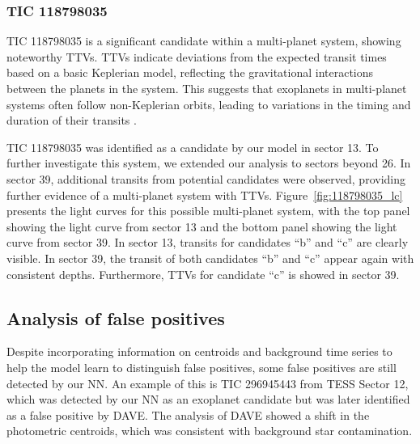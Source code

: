 \subsubsection{TIC 118798035}
TIC 118798035 is a significant candidate within a multi-planet system, showing noteworthy TTVs. TTVs indicate deviations from the expected transit times based on a basic Keplerian model, reflecting the gravitational interactions between the planets in the system. This suggests that exoplanets in multi-planet systems often follow non-Keplerian orbits, leading to variations in the timing and duration of their transits \citep{agol2017transit}. \par

TIC 118798035 was identified as a candidate by our model in sector 13. To further investigate this system, we extended our analysis to sectors beyond 26. In sector 39, additional transits from potential candidates were observed, providing further evidence of a multi-planet system with TTVs. Figure~\ref{fig:118798035_lc} presents the light curves for this possible multi-planet system, with the top panel showing the light curve from sector 13 and the bottom panel showing the light curve from sector 39. In sector 13, transits for candidates ``b'' and ``c'' are clearly visible. In sector 39, the transit of both candidates ``b'' and ``c'' appear again with consistent depths. Furthermore, TTVs for candidate ``c'' is showed in sector 39. \par

\subsection{Analysis of false positives}

Despite incorporating information on centroids and background time series to help the model learn to distinguish false positives, some false positives are still detected by our NN. An example of this is TIC 296945443 from TESS Sector 12, which was detected by our NN as an exoplanet candidate but was later identified as a false positive by DAVE. The analysis of DAVE showed a shift in the photometric centroids, which was consistent with background star contamination. \par

